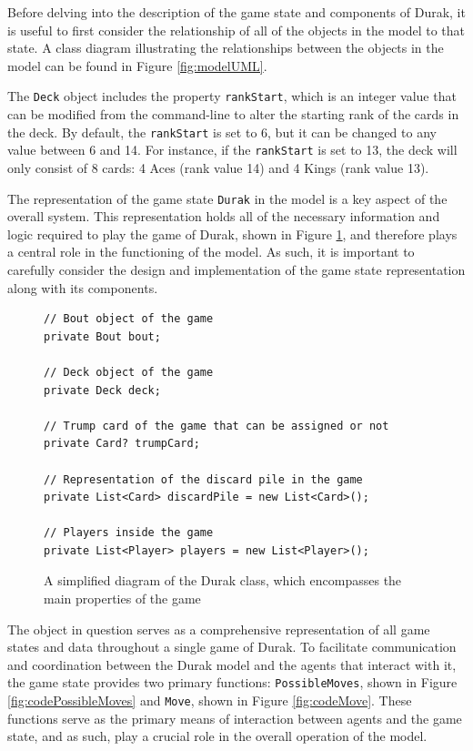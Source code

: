 Before delving into the description of the game state and components of Durak, it is useful to first consider the relationship of all of the objects in the model to that state. A class diagram illustrating the relationships between the objects in the model can be found in Figure \ref{fig:modelUML}.

The \texttt{Deck} object includes the property \texttt{rankStart}, which is an integer value that can be modified from the command-line to alter the starting rank of the cards in the deck. By default, the \texttt{rankStart} is set to 6, but it can be changed to any value between 6 and 14. For instance, if the \texttt{rankStart} is set to 13, the deck will only consist of 8 cards: 4 Aces (rank value 14) and 4 Kings (rank value 13). 

The representation of the game state \texttt{Durak} in the model is a key aspect of the overall system. This representation holds all of the necessary information and logic required to play the game of Durak, shown in Figure \ref{fig:codeDurak}, and therefore plays a central role in the functioning of the model. As such, it is important to carefully consider the design and implementation of the game state representation along with its components. 

\begin{figure}[h]
\captionsetup{justification=centering}
\begin{lstlisting}
// Bout object of the game
private Bout bout;

// Deck object of the game
private Deck deck;

// Trump card of the game that can be assigned or not
private Card? trumpCard;

// Representation of the discard pile in the game
private List<Card> discardPile = new List<Card>();

// Players inside the game
private List<Player> players = new List<Player>();

\end{lstlisting}
\caption{A simplified diagram of the Durak class, which encompasses the main properties of the game}
\label{fig:codeDurak}
\end{figure}

The object in question serves as a comprehensive representation of all game states and data throughout a single game of Durak. To facilitate communication and coordination between the Durak model and the agents that interact with it, the game state provides two primary functions: \texttt{PossibleMoves}, shown in Figure \ref{fig:codePossibleMoves} and \texttt{Move}, shown in Figure \ref{fig:codeMove}. These functions serve as the primary means of interaction between agents and the game state, and as such, play a crucial role in the overall operation of the model. 

